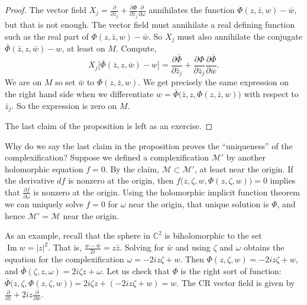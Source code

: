 \documentclass[12pt,openany]{book}
\renewcommand{\Im}{\operatorname{Im}}
\newcommand{\sabs}[1]{\lvert {#1} \rvert}
\newcommand{\C}{{\mathbb{C}}}
\newcommand{\sM}{{\mathscr{M}}}
\theoremstyle{plain}
\theoremstyle{remark}
\theoremstyle{definition}
\theoremstyle{exercise}
\theoremstyle{example}
\begin{document}
\begin{proof}
The vector field
$X_j = \frac{\partial}{\partial \bar{z}_j}
+\frac{\partial \Phi}{\partial \bar{z}_j} \frac{\partial}{\partial \omega}$
annihilates
the function $\Phi(z,\bar{z},w)-\bar{w}$, but that is not enough.
The vector field must annihilate a real defining function such as the
real part of $\Phi(z,\bar{z},w)-\bar{w}$.  So $X_j$ must also
annihilate the conjugate
$\bar{\Phi}(\bar{z},z,\bar{w})-w$, at least on $M$.  Compute,
\begin{equation*}
X_j \bigl[\bar{\Phi}(\bar{z},z,\bar{w})-w\bigr]
=
\frac{\partial \bar{\Phi}}{\partial \bar{z}_j}
+
\frac{\partial \Phi}{\partial \bar{z}_j}
\frac{\partial \bar{\Phi}}{\partial \bar{w}} .
\end{equation*}
We are on $M$ so set $\bar{w}$ to
$\Phi(z,\bar{z},w)$.  We get precisely
the same expression on the right hand side when we
differentiate
$w = \bar{\Phi}\bigl(\bar{z},z,\Phi(z,\bar{z},w)\bigr)$
with respect to $\bar{z}_j$.  So the expression is zero on $M$.

The last claim of the proposition is left as an exercise.
\end{proof}

Why do we say the last claim in the proposition
proves the ``uniqueness'' of the complexification?
Suppose we defined a complexification $\sM'$ by another holomorphic
equation $f=0$.
By the claim, $\sM \subset \sM'$, at least near the origin.
If the derivative $df$ is nonzero at the origin, then
$f\bigl(z,\zeta,w,\Phi(z,\zeta,w)\bigr) = 0$ implies that 
$\frac{\partial f}{\partial \omega}$ is nonzero at the origin.
Using the holomorphic implicit function theorem we can uniquely solve $f=0$
for $\omega$ near the origin, that unique solution is $\Phi$,
and hence $\sM' = \sM$ near the origin.

As an example, recall that the sphere in $\C^2$ is biholomorphic to the set $\Im w =
\sabs{z}^2$.  That is, $\frac{w-\bar{w}}{2i} = z \bar{z}$.  Solving for
$\bar{w}$ and using $\zeta$ and $\omega$ obtains the equation for the
complexification $\omega = -2iz \zeta + w$.  Then
$\Phi(z,\zeta,w) = 
-2iz \zeta + w$, and
$\bar{\Phi}(\zeta,z,\omega) = 2i\zeta z + \omega$.  Let us check
that $\Phi$ is the right sort of function:
$\bar{\Phi}\bigl(z,\zeta,\Phi(z,\zeta,w)\bigr)
=
2i\zeta z + (-2i z \zeta + w) = w$.  The CR vector field is
given by
$\frac{\partial}{\partial \bar{z}}
+2i z \frac{\partial}{\partial \bar{w}}$.
\end{document}
